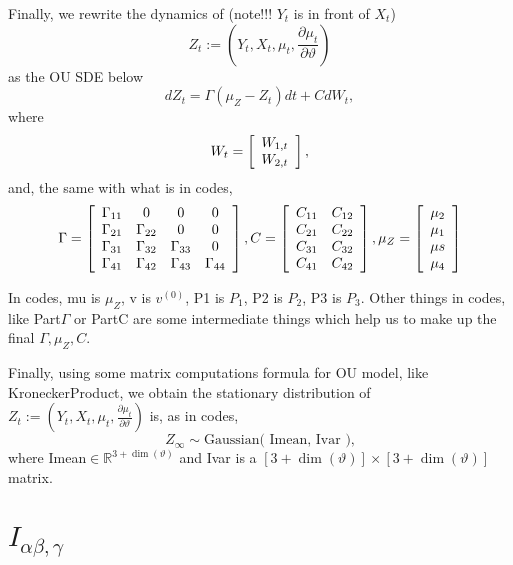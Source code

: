 \documentclass[11pt]{article}%
\theoremstyle{definition}
\begin{document}
Finally, we rewrite the dynamics of (note!!! $Y_{t}$ is in front of $X_{t}$)
\[
Z_{t}:=\left(  Y_{t},X_{t},\mu_{t},\frac{\partial\mu_{t}}{\partial\vartheta
}\right)
\]
as the OU SDE below%
\[
dZ_{t}=\Gamma(\mu_{Z}-Z_{t})dt+CdW_{t},
\]
where%
\[
W_{t}=\left[
\begin{array}
[c]{l}%
{W_{1,t}}\\
{W_{2,t}}%
\end{array}
\right]  ,
\]
and, the same with what is in codes,%
\[
\Gamma=\left[
\begin{array}
[c]{cccc}%
\Gamma_{11} & 0 & 0 & 0\\
\Gamma_{21} & \Gamma_{22} & 0 & 0\\
\Gamma_{31} & \Gamma_{32} & \Gamma_{33} & 0\\
\Gamma_{41} & \Gamma_{42} & \Gamma_{43} & \Gamma_{44}%
\end{array}
\right]  ,C=\left[
\begin{array}
[c]{cc}%
C_{11} & C_{12}\\
C_{21} & C_{22}\\
C_{31} & C_{32}\\
C_{41} & C_{42}%
\end{array}
\right]  ,\mu_{Z}=\left[
\begin{array}
[c]{c}%
\mu_{2}\\
\mu_{1}\\
\mu s\\
\mu_{4}%
\end{array}
\right]
\]


In codes, mu is $\mu_{Z}$, v is $v^{\left(  0\right)  }$, P1 is $P_{1}$, P2 is
$P_{2}$, P3 is $P_{3}$. Other things in codes, like Part$\Gamma$ or PartC are
some intermediate things which help us to make up the final $\Gamma,\mu_{Z},C$.

Finally, using some matrix computations formula for OU model, like
KroneckerProduct, we obtain the stationary distribution of $Z_{t}:=\left(
Y_{t},X_{t},\mu_{t},\frac{\partial\mu_{t}}{\partial\vartheta}\right)  $ is, as
in codes,%
\[
Z_{\infty}\sim\text{Gaussian( Imean, Ivar ),}%
\]
where Imean$\in\mathbb{R}^{3+\dim(\vartheta)}$ and Ivar is a $\left[
3+\dim(\vartheta)\right]  \times\left[  3+\dim(\vartheta)\right]  $ matrix.



\bigskip

\section{$I_{\alpha\beta,\gamma}$}
\end{document}
